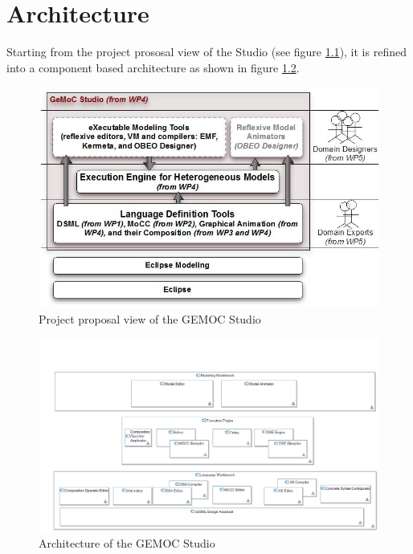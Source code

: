\documentclass{gemoc} %
\begin{document}
\chapter{Architecture}
Starting from the project prososal view of the Studio (see figure \ref{fig:ProjectProposalView}), it is refined into a component based architecture as shown in figure \ref{fig:GlobalView}. 
\begin{figure}[htp]
	\begin{center}
	\includegraphics*[trim=0.0cm 0.0cm 0cm 0.0cm, clip=true, width=1.0\linewidth]{../images/ProjectProposalView.jpg}
	\caption{Project proposal view of the GEMOC Studio}
	\label{fig:ProjectProposalView}
	\end{center}
\end{figure}
\begin{figure}[htp]
	\begin{center}
	\includegraphics*[trim=0.0cm 0.0cm 0cm 0.0cm, clip=true, width=1.0\linewidth]{../images/generated/GlobalView.png}
	\caption{Architecture of the GEMOC Studio}
	\label{fig:GlobalView}
	\end{center}
\end{figure}
\end{document}
